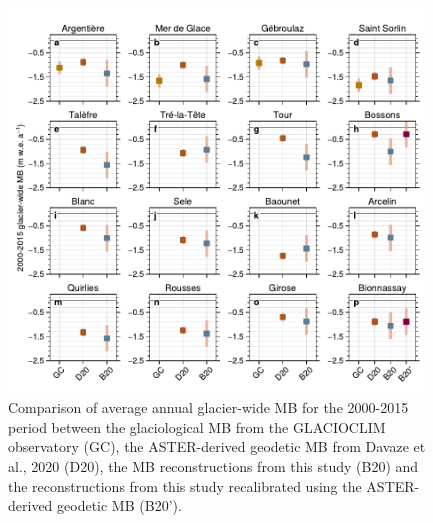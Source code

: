 {\begin{figure}[t]
\centering
\includegraphics[width=11cm]{Figures/past/Figure_2.pdf}
\captionsetup{justification=centering}
\caption{Comparison of average annual glacier-wide MB for the 2000-2015 period between the glaciological MB from the GLACIOCLIM observatory (GC), the ASTER-derived geodetic MB from Davaze et al., 2020 (D20), the MB reconstructions from this study (B20) and the reconstructions from this study recalibrated using the ASTER-derived geodetic MB (B20').}
\label{past:fig2}
\end{figure}

}
